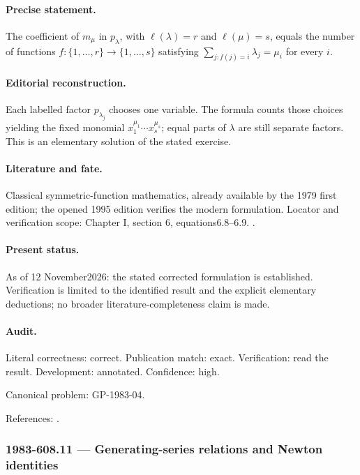 \paragraph{Precise statement.} The coefficient of \(m_\mu\) in \(p_\lambda\), with \(\ell(\lambda)=r\) and \(\ell(\mu)=s\), equals the number of functions \(f:\{1,\ldots,r\}\to\{1,\ldots,s\}\) satisfying \(\sum_{j:f(j)=i}\lambda_j=\mu_i\) for every \(i\).

\paragraph{Editorial reconstruction.} Each labelled factor \(p_{\lambda_j}\) chooses one variable. The formula counts those choices yielding the fixed monomial \(x_1^{\mu_1}\cdots x_s^{\mu_s}\); equal parts of \(\lambda\) are still separate factors. This is an elementary solution of the stated exercise.

\paragraph{Literature and fate.} Classical symmetric-function mathematics, already available by the 1979 first edition; the opened 1995 edition verifies the modern formulation. Locator and verification scope: Chapter I, section 6, equations6.8--6.9. \cite{macdonald1995symmetric}.

\paragraph{Present status.} As of 12 November2026: the stated corrected formulation is established. Verification is limited to the identified result and the explicit elementary deductions; no broader literature-completeness claim is made.

\paragraph{Audit.} Literal correctness: correct. Publication match: exact. Verification: read the result. Development: annotated. Confidence: high.

\noindent Canonical problem: GP-1983-04.\par

\noindent References: \citep{macdonald1995symmetric}.\par

\subsubsection{1983-608.11 --- Generating-series relations and Newton identities}

